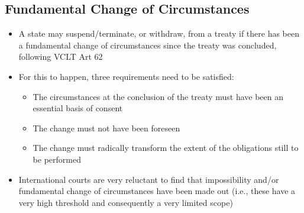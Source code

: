\subsection{Fundamental Change of Circumstances}
\begin{itemize}
    \item A state may suspend/terminate, or withdraw, from a treaty if there has been a fundamental change of circumstances since the treaty was concluded, following VCLT Art 62
    \item For this to happen, three requirements need to be satisfied:
    \begin{itemize}
        \item The circumstances at the conclusion of the treaty must have been an essential basis of consent
        \item The change must not have been foreseen
        \item The change must radically transform the extent of the obligations still to be performed
    \end{itemize}
    \item International courts are very reluctant to find that impossibility and/or fundamental change of circumstances have been made out (i.e., these have a very high threshold and consequently a very limited scope)
\end{itemize}
